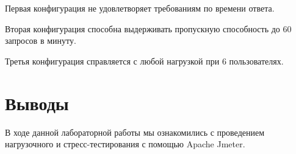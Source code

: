 Первая конфигурация не удовлетворяет требованиям по времени ответа.

Вторая конфигурация способна выдерживать пропускную способность до 60 запросов
в минуту.

Третья конфигурация справляется с любой нагрузкой при 6 пользователях.

\section{Выводы}

В ходе данной лабораторной работы мы ознакомились с проведением нагрузочного
и стресс-тестирования с помощью Apache Jmeter.


